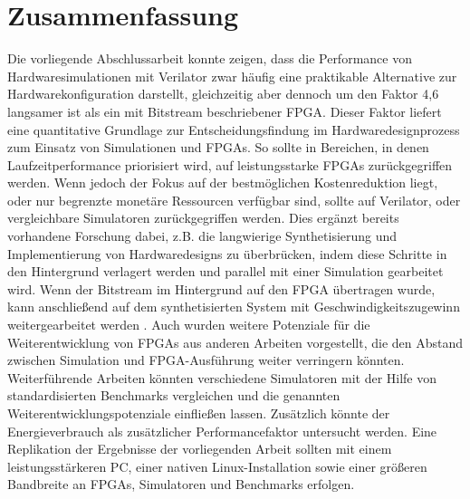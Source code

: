 \chapter{Zusammenfassung}

    Die vorliegende Abschlussarbeit konnte zeigen, dass die Performance von Hardwaresimulationen mit Verilator zwar häufig eine praktikable Alternative zur Hardwarekonfiguration darstellt, gleichzeitig aber dennoch um den Faktor 4,6 langsamer ist als ein mit Bitstream beschriebener FPGA.
    Dieser Faktor liefert eine quantitative Grundlage zur Entscheidungsfindung im Hardwaredesignprozess zum Einsatz von Simulationen und FPGAs.
    So sollte in Bereichen, in denen Laufzeitperformance priorisiert wird, auf leistungsstarke FPGAs zurückgegriffen werden.
    Wenn jedoch der Fokus auf der bestmöglichen Kostenreduktion liegt, oder nur begrenzte monetäre Ressourcen verfügbar sind, sollte auf Verilator, oder vergleichbare Simulatoren zurückgegriffen werden.
    Dies ergänzt bereits vorhandene Forschung dabei, z.B. die langwierige Synthetisierung und Implementierung von Hardwaredesigns zu überbrücken, indem diese Schritte in den Hintergrund verlagert werden und parallel mit einer Simulation gearbeitet wird.
    Wenn der Bitstream im Hintergrund auf den FPGA übertragen wurde, kann anschließend auf dem synthetisierten System mit Geschwindigkeitszugewinn weitergearbeitet werden \parencite{schkufza2019just}.
    Auch wurden weitere Potenziale für die Weiterentwicklung von FPGAs aus anderen Arbeiten vorgestellt, die den Abstand zwischen Simulation und FPGA-Ausführung weiter verringern könnten.
    Weiterführende Arbeiten könnten verschiedene Simulatoren mit der Hilfe von standardisierten Benchmarks vergleichen und die genannten Weiterentwicklungspotenziale einfließen lassen.
    Zusätzlich könnte der Energieverbrauch als zusätzlicher Performancefaktor untersucht werden.
    Eine Replikation der Ergebnisse der vorliegenden Arbeit sollten mit einem leistungsstärkeren PC, einer nativen Linux-Installation sowie einer größeren Bandbreite an FPGAs, Simulatoren und Benchmarks erfolgen.